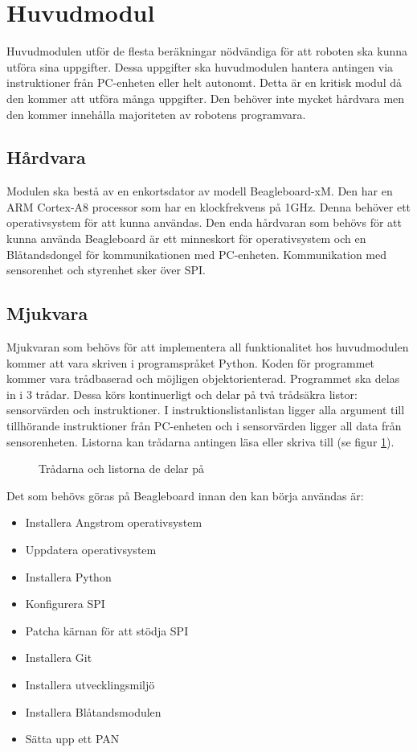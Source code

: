\setcounter{secnumdepth}{5}
\section{Huvudmodul}
Huvudmodulen utför de flesta beräkningar nödvändiga för att roboten ska kunna utföra sina uppgifter. Dessa uppgifter ska huvudmodulen hantera antingen via instruktioner från PC-enheten eller helt autonomt. Detta är en kritisk modul då den kommer att utföra många uppgifter. Den behöver inte mycket hårdvara men den kommer innehålla majoriteten av robotens programvara.

\subsection{Hårdvara}
Modulen ska bestå av en enkortsdator av modell Beagleboard-xM. Den har en ARM Cortex-A8 processor som har en klockfrekvens på 1GHz. Denna behöver ett operativsystem för att kunna användas. Den enda hårdvaran som behövs för att kunna använda Beagleboard är ett minneskort för operativsystem och en Blåtandsdongel för kommunikationen med PC-enheten. Kommunikation med sensorenhet och styrenhet sker över SPI.

\subsection{Mjukvara}
Mjukvaran som behövs för att implementera all funktionalitet hos huvudmodulen kommer att vara skriven i programspråket Python. Koden för programmet kommer vara trådbaserad och möjligen objektorienterad. 
\newline
Programmet ska delas in i 3 trådar. Dessa körs kontinuerligt och delar på två trådsäkra listor: sensorvärden och instruktioner. I instruktionslistanlistan ligger alla argument till tillhörande instruktioner från PC-enheten och i sensorvärden ligger all data från sensorenheten. Listorna kan trådarna antingen läsa eller skriva till (se figur \ref{designspec:huvudmodul-tradar}).

\begin{figure}[h]
\scalebox{0.8}{}
\caption{Trådarna och listorna de delar på} \label{designspec:huvudmodul-tradar}
\end{figure}

Det som behövs göras på Beagleboard innan den kan börja användas är:
\begin{itemize}
\item Installera Angstrom operativsystem
\item Uppdatera operativsystem
\item Installera Python
\item Konfigurera SPI
\item Patcha kärnan för att stödja SPI
\item Installera Git
\item Installera utvecklingsmiljö
\item Installera Blåtandsmodulen
\item Sätta upp ett PAN
\end{itemize}

